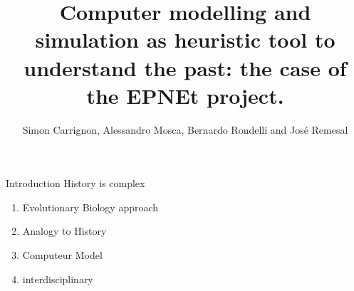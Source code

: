 \documentclass[12pt, notes=show]{beamer}
\title{Computer modelling and simulation as heuristic tool to understand the past: the case of the EPNEt project.}
\author{Simon Carrignon, Alessandro Mosca, Bernardo Rondelli and José Remesal}
\institute{19 May 2016}
\date{
	\scriptsize
	\begin{columns}
		\begin{column}{.2\textwidth}
			\begin{center}
				\texttt{[image: images/bscLogo.jpg]} \hspace{2cm}
			\end{center}
		\end{column}
		\begin{column}{.2\textwidth}
			\begin{column}{.2\textwidth}
				\begin{center}
					\texttt{[image: images/bscLogo.jpg]} \hspace{2cm}
				\end{center}
			\end{column}
			\begin{center}
				\texttt{[image: images/bscLogo.jpg]} \hspace{2cm}
			\end{center}
		\end{column}
		\begin{column}{.2\textwidth}
			\begin{center}
				\texttt{[image: images/upfLogo.jpeg]} %
			\end{center}
		\end{column}
	\end{columns}

}
\begin{document}
\begin{frame}{Introduction}
   History is complex 
   \begin{enumerate}
       \item Evolutionary Biology approach
       \item Analogy to History
       \item Computeur Model
       \item interdisciplinary
   \end{enumerate}

\end{frame}

\end{document}

